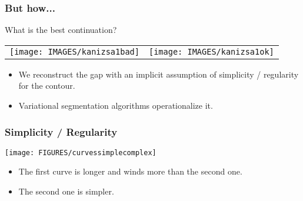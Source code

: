 \documentclass[9pt]{beamer}
\begin{document}
\begin{frame}
  \frametitle{But how...}
  What is the best continuation?
   \begin{center}
     \begin{tabular}[h]{cc}
        \texttt{[image: IMAGES/kanizsa1bad]} &
      \texttt{[image: IMAGES/kanizsa1ok]} \\
     \end{tabular}
   \end{center}
   \begin{itemize}
   \item  We reconstruct the gap with an implicit assumption of simplicity / regularity for the contour.
   \item  Variational segmentation algorithms operationalize it.
   \end{itemize}

\end{frame}





\begin{frame}
  \frametitle{Simplicity / Regularity}
  \begin{center}
    \texttt{[image: FIGURES/curvessimplecomplex]}
  \end{center}
  \begin{itemize}
  \item The first curve is longer and winds more than the second one.
  \item The second one is simpler.
  \end{itemize}
\end{frame}
\end{document}
